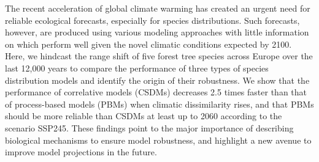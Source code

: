 The recent acceleration of global climate warming has created an urgent need for reliable ecological forecasts, especially for species distributions. Such forecasts, however, are produced using various modeling approaches with little information on which perform well given the novel climatic conditions expected by 2100. Here, we hindcast the range shift of five forest tree species across Europe over the last 12,000 years to compare the performance of three types of species distribution models and identify the origin of their robustness. We show that the performance of correlative models (CSDMs) decreases 2.5 times faster than that of process-based models (PBMs) when climatic dissimilarity rises, and that PBMs should be more reliable than CSDMs at least up to 2060 according to the scenario SSP245. These findings point to the major importance of describing biological mechanisms to ensure model robustness, and highlight a new avenue to improve model projections in the future.